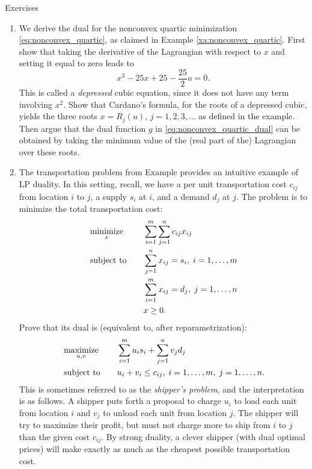 \begin{xcb}{Exercises}
\begin{enumerate}[label=\thechapter.\arabic*]
\item \label{ex:nonconvex_quartic}
  We derive the dual for the nonconvex quartic minimization
  \eqref{eq:nonconvex_quartic}, as claimed in Example
  \ref{xa:nonconvex_quartic}. First show that taking the derivative of the
  Lagrangian with respect to $x$ and setting it equal to zero leads to
  \[
  x^3 - 25x + 25 - \frac{25}{2} u = 0.
  \]
  This is called a \emph{depressed} cubic equation, since it does not have any 
  term involving $x^2$. Show that Cardano's formula, for the roots of a
  depressed cubic, yields the three roots $x = R_j(u)$, $j = 1,2,3,\dots$ as
  defined in the example. Then argue that the dual function $g$ in 
  \eqref{eq:nonconvex_quartic_dual} can be obtained by taking the minimum value
  of the (real part of the) Lagrangian over these roots. 

\item The transportation problem from Example    
  provides an intuitive example of LP duality. In this setting, recall, we have
  a per unit transportation cost $c_{ij}$ from location $i$ to $j$, a supply
  $s_i$ at $i$, and a demand $d_j$ at $j$. The problem is to minimize the total
  transportation cost:   
  \begin{alignat*}{2}
  &\operatorname*{minimize}_x \quad && \sum_{i=1}^m \sum_{j=1}^n c_{ij} x_{ij} \\ 
  &\operatorname{subject\,\,to} \quad && \sum_{j=1}^n x_{ij} = s_i, \; i=1,\dots,m \\
  & && \sum_{i=1}^m x_{ij} = d_j, \; j=1,\dots,n \\
  & && x \geq 0.
  \end{alignat*}
  Prove that its dual is (equivalent to, after reparametrization):    
  \begin{alignat*}{2}
  &\operatorname*{maximize}_{u,v} \quad && \sum_{i=1}^m u_i s_i + \sum_{j=1}^n v_j d_j \\  
  &\operatorname{subject\,\,to} \quad && u_i + v_i \leq c_{ij}, \; i=1,\dots,m, \; j=1,\dots,n.
  \end{alignat*}
  This is sometimes referred to as the \emph{shipper's problem}, and the 
  interpretation is as follows. A shipper puts forth a proposal to charge $u_i$
  to load each unit from location $i$ and $v_j$ to unload each unit from
  location $j$. The shipper will try to maximize their profit, but must not
  charge more to ship from $i$ to $j$ than the given cost $c_{ij}$. By strong
  duality, a clever shipper (with dual optimal prices) will make exactly as much
  as the cheapest possible transportation cost.    
 

\end{enumerate}
\end{xcb}
